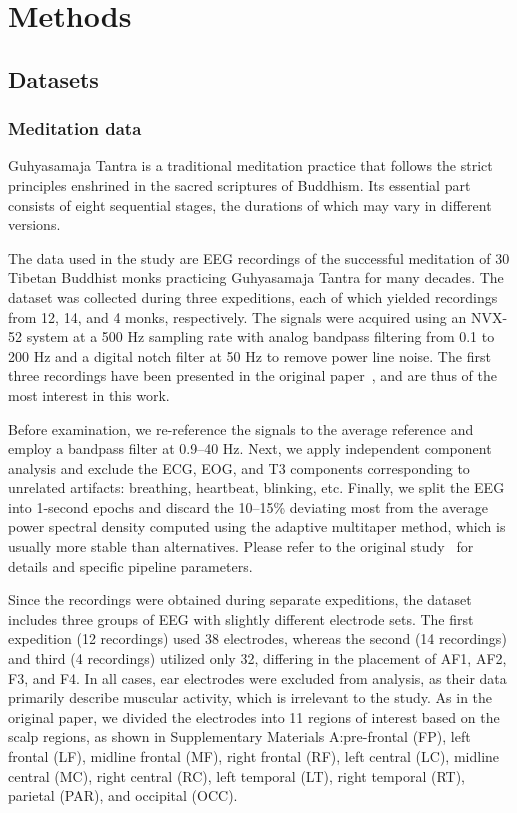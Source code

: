 \documentclass[pdflatex,sn-basic,Numbered]{sn-jnl}
\begin{document}
\section{Methods}

\subsection{Datasets}

\subsubsection{Meditation data}

Guhyasamaja Tantra is a traditional meditation practice that follows the strict principles enshrined in the sacred scriptures of Buddhism. Its essential part consists of eight sequential stages, the durations of which may vary in different versions.

The data used in the study are EEG recordings of the successful meditation of 30 Tibetan Buddhist monks practicing Guhyasamaja Tantra for many decades. The dataset was collected during three expeditions, each of which yielded recordings from 12, 14, and 4 monks, respectively. The signals were acquired using an NVX-52 system at a 500 Hz sampling rate with analog bandpass filtering from 0.1 to 200 Hz and a digital notch filter at 50 Hz to remove power line noise. The first three recordings have been presented in the original paper~\cite{SDA}, and are thus of the most interest in this work. 

Before examination, we re-reference the signals to the average reference and employ a bandpass filter at 0.9--40 Hz. Next, we apply independent component analysis and exclude the ECG, EOG, and T3 components corresponding to unrelated artifacts: breathing, heartbeat, blinking, etc. Finally, we split the EEG into 1-second epochs and discard the 10--15\% deviating most from the average power spectral density computed using the adaptive multitaper method, which is usually more stable than alternatives. Please refer to the original study~\cite{SDA} for details and specific pipeline parameters.

Since the recordings were obtained during separate expeditions, the dataset includes three groups of EEG with slightly different electrode sets. The first expedition (12 recordings) used 38 electrodes, whereas the second (14 recordings) and third (4 recordings) utilized only 32, differing in the placement of AF1, AF2, F3, and F4. In all cases, ear electrodes were excluded from analysis, as their data primarily describe muscular activity, which is irrelevant to the study. As in the original paper, we divided the electrodes into 11 regions of interest based on the scalp regions, as shown in Supplementary Materials A:\@ pre-frontal (FP), left frontal (LF), midline frontal (MF), right frontal (RF), left central (LC), midline central (MC), right central (RC), left temporal (LT), right temporal (RT), parietal (PAR), and occipital (OCC).
\end{document}
